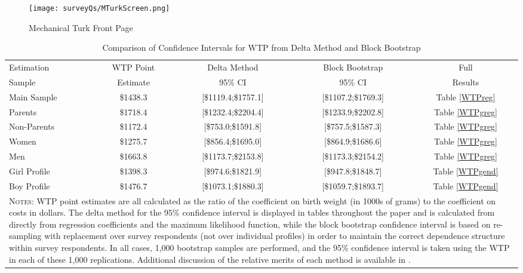 \documentclass[a4paper, 11pt]{article}
\begin{document}
\begin{landscape}
\begin{figure}[htpb!]
  \begin{center}
    \caption{Mechanical Turk Front Page}
    \label{MTurkAdd}
  \texttt{[image: surveyQs/MTurkScreen.png]}
  \end{center}
\end{figure}
\end{landscape}

\begin{table}
  \caption{Comparison of Confidence Intervals for WTP from Delta Method and Block Bootstrap}
  \label{bootstrapCI}
  \begin{tabular}{lcccc} \toprule
    Estimation & WTP Point & Delta Method & Block Bootstrap & Full \\
    Sample     &  Estimate & 95\% CI      & 95\% CI         & Results \\ \midrule
    Main Sample&  \$1438.3 & [\$1119.4;\$1757.1] & [\$1107.2;\$1769.3] & Table \ref{WTPreg} \\
    Parents    &  \$1718.4 & [\$1232.4;\$2204.4] & [\$1233.9;\$2202.8] & Table \ref{WTPgreg} \\
    Non-Parents&  \$1172.4 & [\$753.0;\$1591.8]  & [\$757.5;\$1587.3]  & Table \ref{WTPgreg} \\
    Women      &  \$1275.7 & [\$856.4;\$1695.0]  & [\$864.9;\$1686.6]  & Table \ref{WTPgreg} \\
    Men        &  \$1663.8 & [\$1173.7;\$2153.8] & [\$1173.3;\$2154.2] & Table \ref{WTPgreg} \\
   Girl Profile&  \$1398.3 & [\$974.6;\$1821.9]  & [\$947.8;\$1848.7]  & Table \ref{WTPgend} \\
    Boy Profile&  \$1476.7 & [\$1073.1;\$1880.3] & [\$1059.7;\$1893.7] & Table \ref{WTPgend} \\
    \midrule
    \multicolumn{5}{p{13.6cm}}{{\footnotesize \textsc{Notes}: WTP point estimates
        are all calculated as the ratio of the coefficient on birth weight (in
        1000s of grams) to the coefficient on costs in dollars. The delta method
        for the 95\% confidence interval is displayed in tables throughout the
        paper and is calculated from directly from regression coefficients and
        the maximum likelihood function, while the block bootstrap confidence
        interval is based on re-sampling with replacement over survey respondents
        (not over individual profiles) in order to maintain the correct dependence
        structure within survey respondents.  In all cases, 1,000 bootstrap
        samples are performed, and the 95\% confidence interval is taken using the
        WTP in each of these 1,000 replications. Additional discussion of the
    relative merits of each method is available in \citet{Hole2007}.}}
  \end{tabular}
\end{table}
\end{document}
